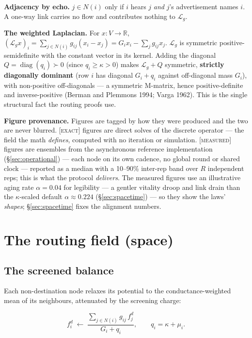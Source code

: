 \documentclass[11pt]{article}
\theoremstyle{plain}
\numberwithin{equation}{section}
\begin{document}
\textbf{Adjacency by echo.} $j\in N(i)$ only if $i$ hears $j$ \emph{and} $j$'s advertisement names $i$. A one-way link carries no flow and contributes nothing to $\mathcal{L}_g$.

\textbf{The weighted Laplacian.} For $x:V\to\mathbb{R}$, $(\mathcal{L}_g x)_i = \sum_{j\in N(i)} g_{ij}(x_i-x_j) = G_i x_i - \sum_{j} g_{ij} x_j .$ $\mathcal{L}_g$ is symmetric positive-semidefinite with the constant vector in its kernel. Adding the diagonal $Q=\operatorname{diag}(q_i)\succ 0$ (since $q_i\ge\kappa>0$) makes $\mathcal{L}_g+Q$ symmetric, \textbf{strictly diagonally dominant} (row $i$ has diagonal $G_i+q_i$ against off-diagonal mass $G_i$), with non-positive off-diagonals — a symmetric M-matrix, hence positive-definite and inverse-positive (Berman and Plemmons 1994; Varga 1962). This is the single structural fact the routing proofs use.

\textbf{Figure provenance.} Figures are tagged by how they were produced and the two are never blurred. \textsc{[exact]} figures are direct solves of the discrete operator — the field the math \emph{defines}, computed with no iteration or simulation. \textsc{[measured]} figures are ensembles from the asynchronous reference implementation (§\ref{sec:operational}) — each node on its own cadence, no global round or shared clock — reported as a median with a 10--90\% inter-rep band over $R$ independent reps; this is what the protocol \emph{delivers}. The measured figures use an illustrative aging rate $\alpha=0.04$ for legibility — a gentler vitality droop and link drain than the $\kappa$-scaled default $\alpha\approx0.224$ (§\ref{sec:spacetime}) — so they show the laws' \emph{shapes}; §\ref{sec:spacetime} fixes the alignment numbers.

\section{The routing field (space)}\label{sec:routing}

\subsection{The screened balance}\label{sec:screened-balance}

Each non-destination node relaxes its potential to the conductance-weighted mean of its neighbours, attenuated by the screening charge:

\begin{equation}\label{eq:relaxation}
f^d_i \;\longleftarrow\; \frac{\sum_{j\in N(i)} g_{ij}\,f^d_j}{G_i + q_i},\qquad q_i = \kappa+\mu_i.
\end{equation}
\end{document}
